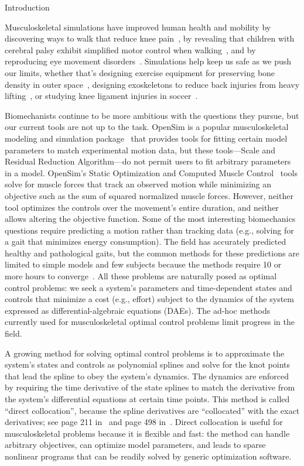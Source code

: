 \documentclass[10pt,letterpaper]{article}
\begin{document}
Introduction

Musculoskeletal simulations have improved human health and mobility by discovering ways to walk that reduce knee pain~\cite{Fregly:2009}, by revealing that children with cerebral palsy exhibit simplified motor control when walking~\cite{Steele:2015}, and by reproducing eye movement disorders~\cite{Priamikov:2016}. Simulations help keep us safe as we push our limits, whether that’s designing exercise equipment for preserving bone density in outer space~\cite{Fregly:2015}, designing exoskeletons to reduce back injuries from heavy lifting~\cite{Manns:2016}, or studying knee ligament injuries in soccer~\cite{Thompson:2017}.

Biomechanists continue to be more ambitious with the questions they pursue, but our current tools are not up to the task. OpenSim is a popular musculoskeletal modeling and simulation package~\cite{Delp:2007ij,Seth:2011hya,Seth:2018gg} that provides tools for fitting certain model parameters to match experimental motion data, but these tools—Scale and Residual Reduction Algorithm—do not permit users to fit arbitrary parameters in a model. OpenSim’s Static Optimization and Computed Muscle Control~\cite{Thelen:2003bba} tools solve for muscle forces that track an observed motion while minimizing an objective such as the sum of squared normalized muscle forces. However, neither tool optimizes the controls over the movement’s entire duration, and neither allows altering the objective function. Some of the most interesting biomechanics questions require predicting a motion rather than tracking data (e.g., solving for a gait that minimizes energy consumption). The field has accurately predicted healthy and pathological gaits, but the common methods for these predictions are limited to simple models and few subjects because the methods require 10 or more hours to converge~\cite{Dorn:2015ji,Song:2018ji,Ong:2019TODO}. All these problems are naturally posed as optimal control problems: we seek a system’s parameters and time-dependent states and controls that minimize a cost (e.g., effort) subject to the dynamics of the system expressed as differential-algebraic equations (DAEs). The ad-hoc methods currently used for musculoskeletal optimal control problems limit progress in the field.

A growing method for solving optimal control problems is to approximate the system’s states and controls as polynomial splines and solve for the knot points that lead the spline to obey the system’s dynamics. The dynamics are enforced by requiring the time derivative of the state splines to match the derivative from the system’s differential equations at certain time points. This method is called “direct collocation”, because the spline derivatives are “collocated” with the exact derivatives; see page 211 in~\cite{Hairer:1993} and page 498 in~\cite{Hairer:1996}. Direct collocation is useful for musculoskeletal problems because it is flexible and fast: the method can handle arbitrary objectives, can optimize model parameters, and leads to sparse nonlinear programs that can be readily solved by generic optimization software.
\end{document}

